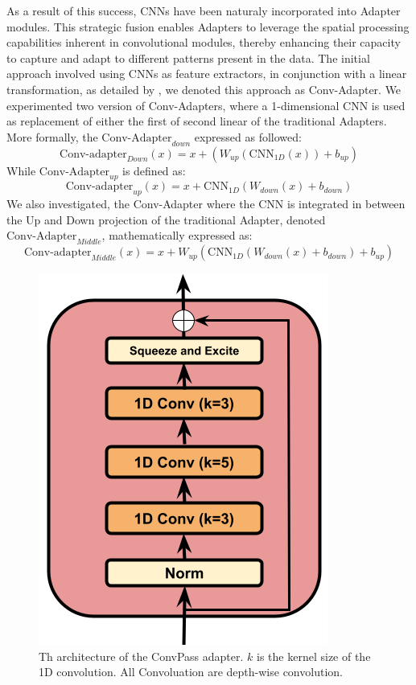 As a result of this success, \acp{CNN} have been naturaly incorporated into Adapter modules. This strategic fusion enables Adapters to leverage the spatial processing capabilities inherent in convolutional modules, thereby enhancing their capacity to capture and adapt to different patterns present in the data. The initial approach involved using \acp{CNN} as feature extractors, in conjunction with a linear transformation, as detailed by \cite{yang23p_interspeech}, we denoted this approach as Conv-Adapter. We experimented two version of Conv-Adapters, where a 1-dimensional \ac{CNN} is used as replacement of either the first of second linear of the traditional Adapters. More formally, the \textit{$\text{Conv-Adapter}_{down}$} expressed as followed:
\begin{equation}
    \text{Conv-adapter}_{Down}(x) = x + (W_{up}(\text{CNN}_{1D}(x))+ b_{up})
\end{equation}
While \textit{$\text{Conv-Adapter}_{up}$} is defined as:
\begin{equation}
    \text{Conv-adapter}_{up}(x) = x + \text{CNN}_{1D}(W_{down}(x)+ b_{down})
\end{equation}
We also investigated, the \cite{muthuchamyselvaraj23_interspeech} Conv-Adapter where the \ac{CNN} is integrated in between the Up and Down projection of the traditional Adapter, denoted \textit{$\text{Conv-Adapter}_{Middle}$}, mathematically expressed as:
\begin{equation}
    \text{Conv-adapter}_{Middle}(x) = x + W_{up}(\text{CNN}_{1D}(W_{down}(x)+ b_{down})+ b_{up})
\end{equation}

\begin{figure}
    \begin{center}
        \includegraphics[scale=0.4]{imgs/ConvPass.png}
        \caption{Th architecture of the ConvPass adapter. $k$ is the kernel size of the 1D convolution. All Convoluation are depth-wise convolution.}
        \label{fig:convpass}
    \end{center}
\end{figure}

